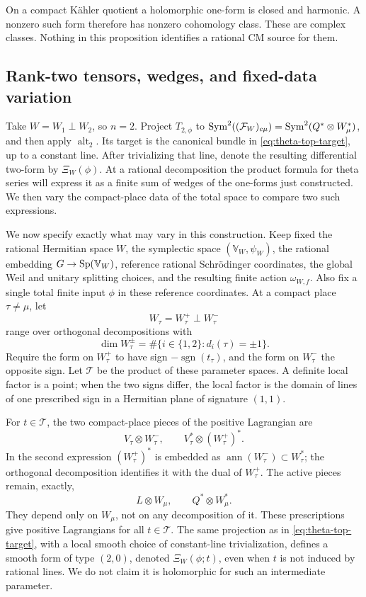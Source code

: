 On a compact K\"ahler quotient a holomorphic one-form is closed
and harmonic.  A nonzero such form therefore has nonzero
cohomology class.  These are complex classes.  Nothing in this
proposition identifies a rational CM source for them.

\subsection{Rank-two tensors, wedges, and fixed-data variation}\label{subsec:theta-rank-two}

Take \(W=W_1\perp W_2\), so \(n=2\).  Project \(T_{2,\phi}\)
to \(\operatorname{Sym}^2((\mathcal F_W)_{c\mu})
=\operatorname{Sym}^2(Q^*\otimes W_\mu^*)\), and then apply
\(\operatorname{alt}_2\).  Its target is the canonical
bundle in \eqref{eq:theta-top-target}, up to a constant line.
After trivializing that line, denote the resulting differential
two-form by \(\Xi_W(\phi)\).  At a rational decomposition the product
formula for theta series will express it as a finite sum of wedges
of the one-forms just constructed.  We then vary the compact-place
data of the total space to compare two such expressions.

We now specify exactly what may vary in this construction.
Keep fixed the rational Hermitian space \(W\), the symplectic
space \((\mathbb V_W,\psi_W)\), the rational embedding
\(G\to\operatorname{Sp}(\mathbb V_W)\), reference rational Schr\"odinger
coordinates, the global Weil and unitary splitting choices, and
the resulting finite action \(\omega_{W,f}\).  Also fix a single
total finite input \(\phi\) in these reference coordinates.
At a compact place \(\tau\ne\mu\), let
\[
 W_\tau=W_\tau^+\perp W_\tau^-
\]
range over orthogonal decompositions with
\[
 \dim W_\tau^\pm=\#\{i\in\{1,2\}:d_i(\tau)=\pm1\}.
\]
Require the form on \(W_\tau^+\) to have sign
\(-\operatorname{sgn}(t_\tau)\), and the form on
\(W_\tau^-\) the opposite sign.  Let \(\mathcal T\) be the
product of these parameter spaces.  A definite local factor is
a point; when the two signs differ, the local factor is the
domain of lines of one prescribed sign in a Hermitian plane of
signature \((1,1)\).

For \(t\in\mathcal T\), the two compact-place pieces of the
positive Lagrangian are
\[
 V_\tau\otimes W_\tau^-,
 \qquad
 V_\tau^*\otimes(W_\tau^+)^*.
\]
In the second expression \((W_\tau^+)^*\) is embedded as
\(\operatorname{ann}(W_\tau^-)\subset W_\tau^*\); the
orthogonal decomposition identifies it with the dual of
\(W_\tau^+\).  The active pieces remain, exactly,
\[
 L\otimes W_\mu,\qquad Q^*\otimes W_\mu^*.
\]
They depend only on \(W_\mu\), not on any decomposition of it.
These prescriptions give positive Lagrangians for all
\(t\in\mathcal T\).  The same projection as in
\eqref{eq:theta-top-target}, with a local smooth choice of
constant-line trivialization, defines a smooth form of type
\((2,0)\), denoted \(\Xi_W(\phi;t)\), even when \(t\) is not
induced by rational lines.  We do not claim it is holomorphic
for such an intermediate parameter.


